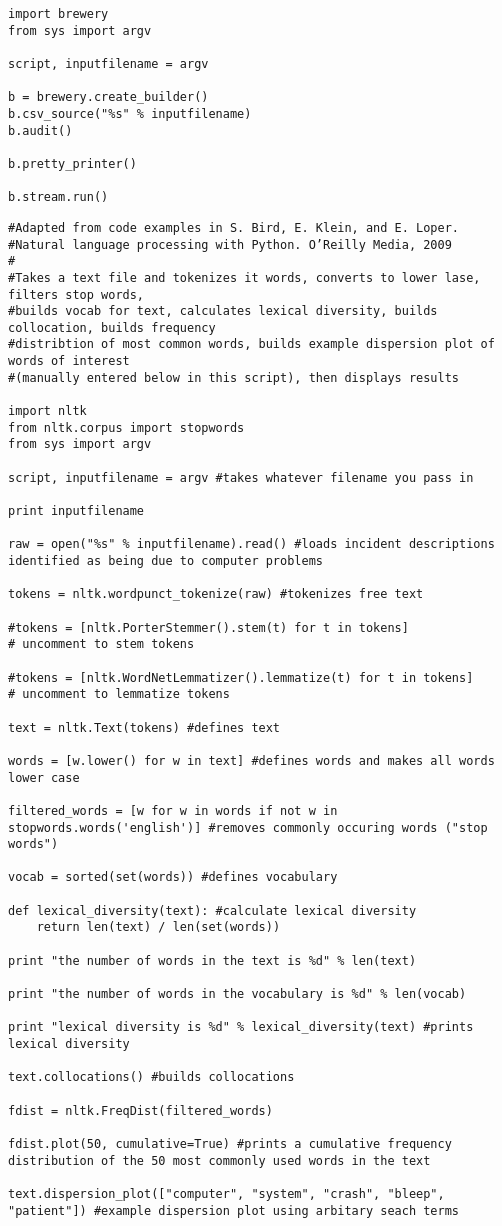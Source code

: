 \begin{verbatim}
import brewery
from sys import argv

script, inputfilename = argv

b = brewery.create_builder()
b.csv_source("%s" % inputfilename)
b.audit()

b.pretty_printer()

b.stream.run()
\end{verbatim}

\begin{verbatim}
#Adapted from code examples in S. Bird, E. Klein, and E. Loper. 
#Natural language processing with Python. O’Reilly Media, 2009
#
#Takes a text file and tokenizes it words, converts to lower lase, filters stop words, 
#builds vocab for text, calculates lexical diversity, builds collocation, builds frequency 
#distribtion of most common words, builds example dispersion plot of words of interest 
#(manually entered below in this script), then displays results 

import nltk
from nltk.corpus import stopwords
from sys import argv

script, inputfilename = argv #takes whatever filename you pass in

print inputfilename

raw = open("%s" % inputfilename).read() #loads incident descriptions identified as being due to computer problems

tokens = nltk.wordpunct_tokenize(raw) #tokenizes free text

#tokens = [nltk.PorterStemmer().stem(t) for t in tokens] 
# uncomment to stem tokens

#tokens = [nltk.WordNetLemmatizer().lemmatize(t) for t in tokens]
# uncomment to lemmatize tokens

text = nltk.Text(tokens) #defines text

words = [w.lower() for w in text] #defines words and makes all words lower case

filtered_words = [w for w in words if not w in stopwords.words('english')] #removes commonly occuring words ("stop words")

vocab = sorted(set(words)) #defines vocabulary

def lexical_diversity(text): #calculate lexical diversity
    return len(text) / len(set(words))

print "the number of words in the text is %d" % len(text)

print "the number of words in the vocabulary is %d" % len(vocab) 

print "lexical diversity is %d" % lexical_diversity(text) #prints lexical diversity

text.collocations() #builds collocations

fdist = nltk.FreqDist(filtered_words)

fdist.plot(50, cumulative=True) #prints a cumulative frequency distribution of the 50 most commonly used words in the text

text.dispersion_plot(["computer", "system", "crash", "bleep", "patient"]) #example dispersion plot using arbitary seach terms
\end{verbatim}



